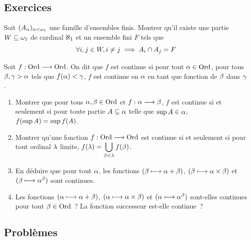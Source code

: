 \subsection{Exercices}

\begin{exercise}
  Soit $(A_{\alpha})_{\alpha < \omega_1}$ une famille d'ensembles finis. Montrer
  qu'il existe une partie $W \subseteq \omega_1$ de cardinal $\aleph_1$ et un
  ensemble fini $F$ tels que
  \[\forall i,j \in W, i \neq j \implies A_i \cap A_j = F\]
\end{exercise}

\begin{exercise}
  Soit $f : \displaystyle \operatorname{Ord} \longrightarrow \operatorname{Ord}$. On dit que $f$ est continue si pour tout
  $\alpha\in\operatorname{Ord}$, pour tous $\beta,\gamma > \alpha$ tels que
  $f(\alpha) < \gamma$, $f$ est continue en $\alpha$ en tant que fonction de
  $\beta$ dans $\gamma$.
  \begin{enumerate}[label=(\roman*)]
  \item Montrer que pour tous $\alpha,\beta\in\operatorname{Ord}$ et
    $f : \displaystyle \alpha \longrightarrow \beta$, $f$ est continue si et seulement si
    pour toute partie $A\subseteq\alpha$ telle que $\sup A \in\alpha$,
    $f(\sup A) = \sup f(A)$.
  \item Montrer qu'une fonction $f : \displaystyle \operatorname{Ord} \longrightarrow \operatorname{Ord}$ est continue si et
    seulement si pour tout ordinal $\lambda$ limite,
    $f(\lambda) = \displaystyle\bigcup_{\beta < \lambda} f(\beta)$.
  \item En déduire que pour tout $\alpha$, les fonctions
    $(\beta\longmapsto \alpha + \beta)$,
    $(\beta \longmapsto \alpha\times \beta)$ et
    $(\beta\longmapsto \alpha^{\beta})$ sont continues.
  \item Les fonctions
    $(\alpha\longmapsto \alpha + \beta)$,
    $(\alpha \longmapsto \alpha\times \beta)$ et
    $(\alpha\longmapsto \alpha^{\beta})$ sont-elles continues pour tout
    $\beta \in \operatorname{Ord}$~? La fonction successeur est-elle continue~?
  \end{enumerate}
\end{exercise}

\clearpage

\subsection{Problèmes}

